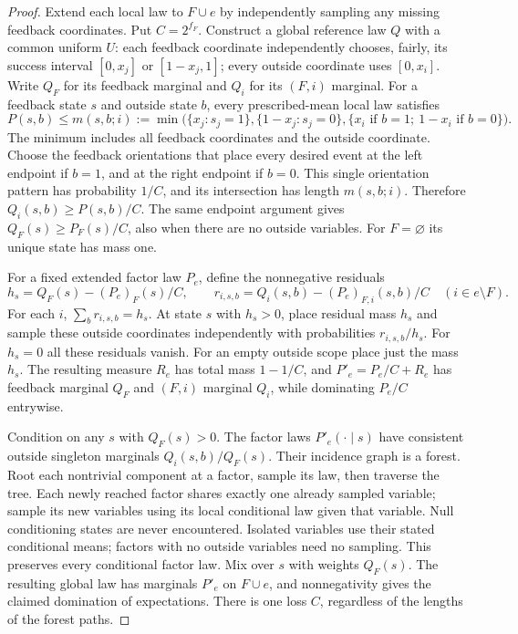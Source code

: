 \begin{proof}
Extend each local law to $F\cup e$ by independently sampling any missing
feedback coordinates. Put $C=2^{f_F}$. Construct a global reference law
$Q$ with a common uniform $U$: each feedback coordinate independently
chooses, fairly, its success interval $[0,x_j]$ or $[1-x_j,1]$;
every outside coordinate uses $[0,x_i]$. Write $Q_F$ for its feedback
marginal and $Q_i$ for its $(F,i)$ marginal. For a feedback state $s$
and outside state $b$, every prescribed-mean local law satisfies
\[
 P(s,b)\le m(s,b;i):=\min\bigl(\{x_j:s_j=1\},
 \{1-x_j:s_j=0\},\{x_i\text{ if }b=1;\ 1-x_i\text{ if }b=0\}\bigr).
\]
The minimum includes all feedback coordinates and the outside coordinate.
Choose the feedback orientations that place every desired event at the
left endpoint if $b=1$, and at the right endpoint if $b=0$. This single
orientation pattern has probability $1/C$, and its intersection has
length $m(s,b;i)$. Therefore $Q_i(s,b)\ge P(s,b)/C$.
The same endpoint argument gives $Q_F(s)\ge P_F(s)/C$, also when there
are no outside variables. For $F=\varnothing$ its unique state has mass
one.

For a fixed extended factor law $P_e$, define the nonnegative residuals
\[
 h_s=Q_F(s)-(P_e)_F(s)/C,\qquad
 r_{i,s,b}=Q_i(s,b)-(P_e)_{F,i}(s,b)/C\quad(i\in e\setminus F).
\]
For each $i$, $\sum_b r_{i,s,b}=h_s$. At state $s$ with $h_s>0$, place
residual mass $h_s$ and sample these outside coordinates independently
with probabilities $r_{i,s,b}/h_s$. For $h_s=0$ all these residuals
vanish. For an empty outside scope place just the mass $h_s$.
The resulting measure $R_e$ has total mass $1-1/C$, and
$P'_e=P_e/C+R_e$ has feedback marginal $Q_F$ and $(F,i)$ marginal $Q_i$,
while dominating $P_e/C$ entrywise.

Condition on any $s$ with $Q_F(s)>0$. The factor laws $P'_e(\cdot\mid s)$
have consistent outside singleton marginals $Q_i(s,b)/Q_F(s)$. Their
incidence graph is a forest. Root each nontrivial component at a factor,
sample its law, then traverse the tree. Each newly reached factor shares
exactly one already sampled variable; sample its new variables using its
local conditional law given that variable. Null conditioning states are
never encountered. Isolated variables use their stated conditional means;
factors with no outside variables need no sampling. This preserves every
conditional factor law. Mix over $s$ with weights $Q_F(s)$. The resulting
global law has marginals $P'_e$ on $F\cup e$, and nonnegativity gives
the claimed domination of expectations. There is one loss $C$, regardless
of the lengths of the forest paths.
\end{proof}

